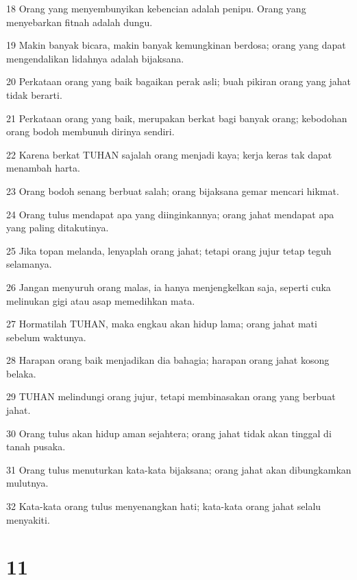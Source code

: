 \par 18 Orang yang menyembunyikan kebencian adalah penipu. Orang yang menyebarkan fitnah adalah dungu.
\par 19 Makin banyak bicara, makin banyak kemungkinan berdosa; orang yang dapat mengendalikan lidahnya adalah bijaksana.
\par 20 Perkataan orang yang baik bagaikan perak asli; buah pikiran orang yang jahat tidak berarti.
\par 21 Perkataan orang yang baik, merupakan berkat bagi banyak orang; kebodohan orang bodoh membunuh dirinya sendiri.
\par 22 Karena berkat TUHAN sajalah orang menjadi kaya; kerja keras tak dapat menambah harta.
\par 23 Orang bodoh senang berbuat salah; orang bijaksana gemar mencari hikmat.
\par 24 Orang tulus mendapat apa yang diinginkannya; orang jahat mendapat apa yang paling ditakutinya.
\par 25 Jika topan melanda, lenyaplah orang jahat; tetapi orang jujur tetap teguh selamanya.
\par 26 Jangan menyuruh orang malas, ia hanya menjengkelkan saja, seperti cuka melinukan gigi atau asap memedihkan mata.
\par 27 Hormatilah TUHAN, maka engkau akan hidup lama; orang jahat mati sebelum waktunya.
\par 28 Harapan orang baik menjadikan dia bahagia; harapan orang jahat kosong belaka.
\par 29 TUHAN melindungi orang jujur, tetapi membinasakan orang yang berbuat jahat.
\par 30 Orang tulus akan hidup aman sejahtera; orang jahat tidak akan tinggal di tanah pusaka.
\par 31 Orang tulus menuturkan kata-kata bijaksana; orang jahat akan dibungkamkan mulutnya.
\par 32 Kata-kata orang tulus menyenangkan hati; kata-kata orang jahat selalu menyakiti.

\chapter{11}

